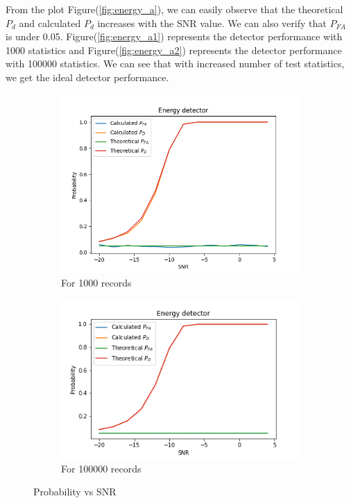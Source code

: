 \documentclass[a4 paper]{article}
\begin{document}
From the plot Figure(\ref{fig:energy_a}), we can easily observe that the theoretical $P_{d}$ and calculated $P_{d}$ increases with the SNR value. We can also verify that $P_{FA}$ is under 0.05. Figure(\ref{fig:energy_a1}) represents the detector performance with 1000 statistics and Figure(\ref{fig:energy_a2}) represents the detector performance with 100000 statistics. We can see that with increased number of test statistics, we get the ideal detector performance. 


\vspace{-2em}
\begin{figure}[h]
	\centering
	\begin{subfigure}{.5\textwidth}
		\includegraphics[width=1\linewidth]{../results/energy_detector_b.png}
		\caption{For 1000 records}
		\label{fig:energy_b1}
	\end{subfigure}%
	\begin{subfigure}{.5\textwidth}
		\includegraphics[width=1.15\linewidth]{../results/energy_detector_b_ideal.png}
		\caption{For 100000 records}
		\label{fig:energy_b2}
	\end{subfigure}
	\caption{Probability vs SNR}
	\label{fig:energy_b}
\end{figure}
\end{document}
